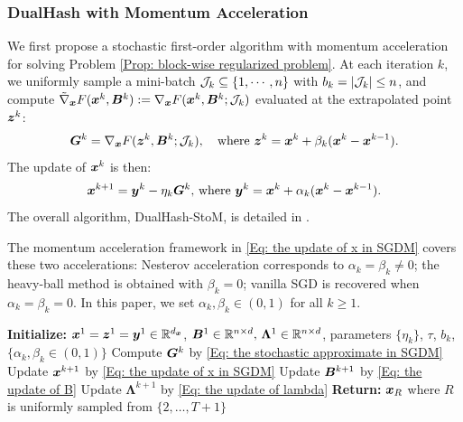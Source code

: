 \subsubsection{DualHash with Momentum Acceleration}
We first propose a stochastic first-order algorithm with momentum acceleration for solving Problem \eqref{Prop: block-wise regularized problem}. At each iteration $k$, we uniformly sample a mini-batch $\mathcal{J}_k \subseteq \{1,\cdots,n\}$ with $b_k = |\mathcal{J}_k| \leq n$, and compute $\tilde{\nabla}_{\bm{x}} F(\bm{x}^k, \bm{B}^k) := \nabla_{\bm{x}} F(\bm{x}^k, \bm{B}^k; \mathcal{J}_k)$ evaluated at the extrapolated point $\bm{z}^k$:
\begin{align}
\label{Eq: the stochastic approximate in SGDM}
    \bm{G}^k = \nabla_{\bm{x}} F(\bm{z}^k, \bm{B}^k; \mathcal{J}_k),\quad \text{where } \bm{z}^k = \bm{x}^k + \beta_k (\bm{x}^k - \bm{x}^{k-1}).
\end{align}The update of \( \bm{x}^k\) is then:
\begin{align}
\label{Eq: the update of x in SGDM}
    \bm{x}^{k+1} = \bm{y}^k - \eta_k \bm{G}^k,\,\text{where } \bm{y}^k = \bm{x}^k + \alpha_k (\bm{x}^k - \bm{x}^{k-1}). 
\end{align}The overall algorithm, DualHash-StoM, is detailed in .
\begin{remark}
The momentum acceleration framework in \eqref{Eq: the update of x in SGDM} covers these two accelerations: Nesterov acceleration  \cite{Nesterov1983AMF} corresponds to $\alpha_k = \beta_k \neq 0$; the heavy-ball method \cite{Polyak1964} is obtained with $\beta_k = 0$; vanilla SGD is recovered when $\alpha_k = \beta_k = 0$. In this paper, we set $\alpha_k, \beta_k \in (0,1)$ for all $k \geq 1$.
\end{remark}
\begin{algorithm}[t]
\caption{DualHash-StoM}
\label{alg:our_algorithm_sgdm}
\begin{algorithmic}[1]
\STATE \textbf{Initialize:} $\bm{x}^1 = \bm{z}^1 = \bm{y}^1 \in \mathbb{R}^{d_{\bm{x}}} $, \( \bm{B}^1 \in \mathbb{R}^{n\times d},\, \bm{\Lambda}^1\in \mathbb{R}^{n\times d}\), parameters $\{\eta_k\} $, $\tau$, $b_k$, $\{\alpha_k, \beta_k \in (0,1)\}$
  \STATE Compute \(\bm{G}^k\) by \eqref{Eq: the stochastic approximate in SGDM}
  \STATE Update $\bm{x}^{k+1}$ by \eqref{Eq: the update of x in SGDM}
  \STATE Update $\bm{B}^{k+1}$ by \eqref{Eq: the update of B}
  \STATE Update $\bm{\Lambda}^{k+1}$ by \eqref{Eq: the update of lambda}
\ENDFOR
\STATE \textbf{Return:} $\bm{x}_R$ where $R$ is uniformly sampled from $\{2, \ldots, T+1\}$
\end{algorithmic}
\end{algorithm}
